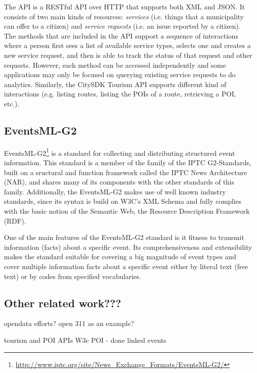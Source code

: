 \documentclass[times]{ettauth}
\begin{document}
The API is a RESTful API over HTTP that supports both XML and JSON.
It consists of two main kinds of resources: \emph{services} (i.e. things that a municipality can offer to a citizen) and \emph{service requests} (i.e. an issue reported by a citizen).
The methods that are included in the API support a sequence of interactions where a person first sees a list of available service types, selects one and creates a new service request, and then is able to track the status of that request and other requests.
However, each method can be accessed independently and some applications may only be focused on querying existing service requests to do analytics.
Similarly, the CitySDK Tourism API supports different kind of interactions (e.g. listing routes, listing the POIs of a route, retrieving a POI, etc.).

\subsection{EventsML-G2}

EventsML-G2\footnote{\url{http://www.iptc.org/site/News_Exchange_Formats/EventsML-G2/}} is a standard for collecting and distributing structured event information. 
This standard is a member of the family of the IPTC G2-Standards, built on a sructural and function framework called the IPTC News Architecture (NAR), and shares many of its components with the other standards of this family. 
Additionally, the EventsML-G2 makes use of well known industry standards, since its syntax is build on W3C's XML Schema and fully complies with the basic notion of the Semantic Web, the Resource Description Framework (RDF).

One of the main features of the EventsML-G2 standard is it fitness to transmit information (facts) about a specific event.
Its comprehensiveness and extensibility makes the standard suitable for covering a big magnitude of event types and cover multiple information facts about a specific event either by literal text (free text) or by codes from specified vocabularies. 



\subsection{Other related work???}


opendata efforts?
 open 311 as an example?

tourism and POI APIs
 W3c POI - done
 linked events
\end{document}
